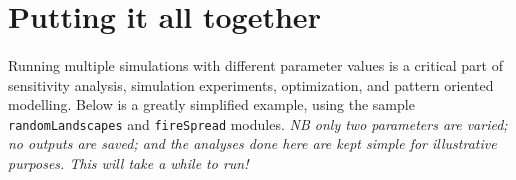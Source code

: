 \documentclass{article}
\begin{document}
\newpage

\section{Putting it all together}

\paragraph{}
Running multiple simulations with different parameter values is a critical part of sensitivity analysis, simulation experiments, optimization, and pattern oriented modelling. Below is a greatly simplified example, using the sample \texttt{randomLandscapes} and \texttt{fireSpread} modules. \textit{NB only two parameters are varied; no outputs are saved; and the analyses done here are kept simple for illustrative purposes. This will take a while to run!}
\end{document}
